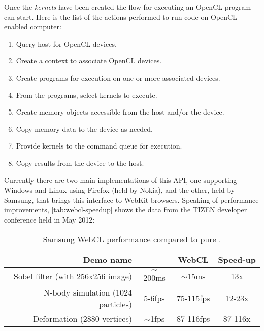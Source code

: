 Once the \emph{kernels} have been created the flow for executing an \ac{OpenCL}
program can start. Here is the list of the actions performed to run code on
\ac{OpenCL} enabled computer:
\begin{enumerate}
    \item Query host for \ac{OpenCL} devices.
    \item Create a context to associate \ac{OpenCL} devices.
    \item Create programs for execution on one or more associated devices.
    \item From the programs, select kernels to execute.
    \item Create memory objects accessible from the host and/or the device.
    \item Copy memory data to the device as needed.
    \item Provide kernels to the command queue for execution.
    \item Copy results from the device to the host.
\end{enumerate}

Currently there are two main implementations of this API, one supporting Windows
and Linux using Firefox (held by Nokia), and the other, held by Samsung, that
brings this interface to WebKit browsers. Speaking of performance improvements,
\autoref{tab:webcl-speedup} shows the data from the TIZEN\tm{} developer
conference held in May 2012:
\begin{table}[h!tb]
    \caption{Samsung WebCL performance compared to pure \js{}.}
    \label{tab:webcl-speedup}
    \centering
    \begin{tabular}{r|c|c|c}
        \textbf{Demo name} & \textbf{\js{}} & \textbf{WebCL} & \textbf{Speed-up}\\
        \hline
        Sobel filter (with 256x256 image) & $\sim{}$200ms & $\sim{}$15ms & 13x\\
        \hline
        N-body simulation (1024 particles) & 5-6fps & 75-115fps & 12-23x\\
        \hline
        Deformation (2880 vertices) & $\sim{}$1fps & 87-116fps & 87-116x
    \end{tabular}
\end{table}

